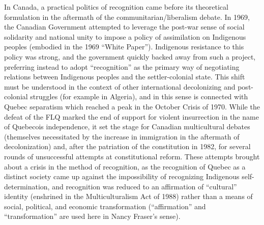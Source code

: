 \documentclass[12pt,oneside]{memoir}
\begin{document}
In Canada, a practical politics of recognition came before its theoretical formulation in the aftermath of the communitarian/liberalism debate. In 1969, the Canadian Government attempted to leverage the post-war sense of social solidarity and national unity to impose a policy of assimilation on Indigenous peoples (embodied in the 1969 ``White Paper''). Indigenous resistance to this policy was strong, and the government quickly backed away from such a project, preferring instead to adopt ``recognition'' as the primary way of negotiating relations between Indigenous peoples and the settler-colonial state. This shift must be understood in the context of other international decolonizing and post-colonial struggles (for example in Algeria), and in this sense is connected with Quebec separatism which reached a peak in the October Crisis of 1970. While the defeat of the FLQ marked the end of support for violent insurrection in the name of Quebecois independence, it set the stage for Canadian multicultural debates (themselves necessitated by the increase in immigration in the aftermath of decolonization) and, after the patriation of the constitution in 1982, for several rounds of unsuccessful attempts at constitutional reform. These attempts brought about a crisis in the method of recognition, as the recognition of Quebec as a distinct society came up against the impossibility of recognizing Indigenous self-determination, and recognition was reduced to an affirmation of ``cultural'' identity (enshrined in the Multiculturalism Act of 1988) rather than a means of social, political, and economic transformation (``affirmation'' and ``transformation'' are used here in Nancy Fraser's sense).
\end{document}
